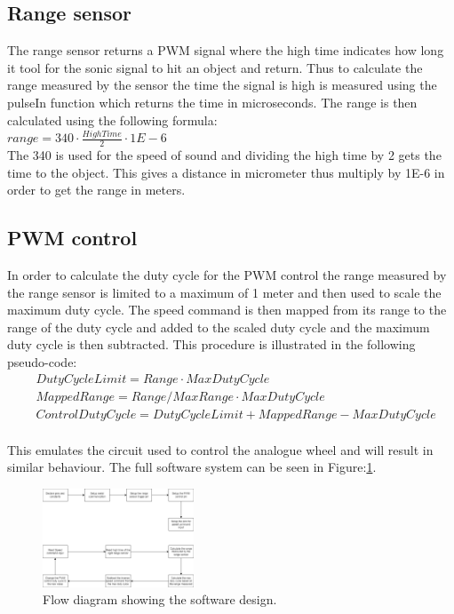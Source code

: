 \subsection{Range sensor}
The range sensor returns a PWM signal where the high time indicates how long it tool for the sonic signal to hit an object and return. Thus to calculate the range measured by the sensor the time the signal is high is measured using the pulseIn function which returns the time in microseconds. The range is  then calculated using the following formula:\\ $range = 340 \cdot \frac{HighTime}{2} \cdot 1E-6$\\ 
The 340 is used for the speed of sound and dividing the high time by 2 gets the time to the object. This gives a distance in micrometer thus multiply by 1E-6 in order to get the range in meters.
\subsection{PWM control}
In order to calculate the duty cycle for the PWM control the range measured by the range sensor is limited to a maximum of 1 meter and then used to scale the maximum duty cycle. The speed command is then mapped from its range to the range of the duty cycle and added to the scaled duty cycle and the maximum duty cycle is then subtracted. This procedure is illustrated in the following pseudo-code:\\
\begin{align*}
& DutyCycleLimit = Range \cdot MaxDutyCycle\\
& MappedRange = Range/MaxRange \cdot MaxDutyCycle\\
& ControlDutyCycle = DutyCycleLimit+MappedRange-MaxDutyCycle\\
\end{align*}

This emulates the circuit used to control the analogue wheel and will result in similar behaviour. The full software system can be seen in Figure:\ref{fig:dig_ctrl_flow}.

\begin{figure}[H]
\centering
\includegraphics[width = 0.4\textwidth]{./Figures/Dig_Ctrl_Flow.png}
\caption{Flow diagram showing the software design.}
\label{fig:dig_ctrl_flow}
\end{figure}

